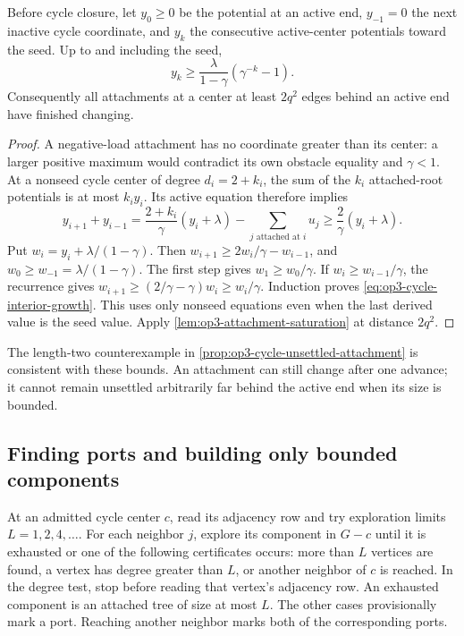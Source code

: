 \begin{lemma}
\label{lem:op3-cycle-interior-growth}
Before cycle closure, let $y_0\geq0$ be the potential at an active end,
$y_{-1}=0$ the next inactive cycle coordinate, and $y_k$ the consecutive
active-center potentials toward the seed. Up to and including the seed,
\begin{equation}
 y_k\geq\frac{\lambda}{1-\gamma}(\gamma^{-k}-1).
 \label{eq:op3-cycle-interior-growth}
\end{equation}
Consequently all attachments at a center at least $2q^2$ edges behind an
active end have finished changing.
\end{lemma}
\begin{proof}
A negative-load attachment has no coordinate greater than its center:
a larger positive maximum would contradict its own obstacle equality and
$\gamma<1$. At a nonseed cycle center of degree $d_i=2+k_i$, the sum of
the $k_i$ attached-root potentials is at most $k_i y_i$. Its active
equation therefore implies
\[
 y_{i+1}+y_{i-1}
 =\frac{2+k_i}{\gamma}(y_i+\lambda)
     -\sum_{j\text{ attached at }i}u_j
 \geq\frac2\gamma(y_i+\lambda).
\]
Put $w_i=y_i+\lambda/(1-\gamma)$. Then
$w_{i+1}\geq2w_i/\gamma-w_{i-1}$, and
$w_0\geq w_{-1}=\lambda/(1-\gamma)$.
The first step gives $w_1\geq w_0/\gamma$. If
$w_i\geq w_{i-1}/\gamma$, the recurrence gives
$w_{i+1}\geq(2/\gamma-\gamma)w_i\geq w_i/\gamma$.
Induction proves \cref{eq:op3-cycle-interior-growth}. This uses only
nonseed equations even when the last derived value is the seed value.
Apply \cref{lem:op3-attachment-saturation} at distance $2q^2$.
\end{proof}

The length-two counterexample in
\cref{prop:op3-cycle-unsettled-attachment} is consistent with these bounds.
An attachment can still change after one advance; it cannot remain
unsettled arbitrarily far behind the active end when its size is bounded.

\subsection{Finding ports and building only bounded components}

At an admitted cycle center $c$, read its adjacency row and try exploration
limits $L=1,2,4,\ldots$. For each neighbor $j$, explore its component in
$G-c$ until it is exhausted or one of the following certificates occurs:
more than $L$ vertices are found, a vertex has degree greater than $L$, or
another neighbor of $c$ is reached. In the degree test, stop before reading
that vertex's adjacency row. An exhausted component is an attached tree of
size at most $L$. The other cases provisionally mark a port. Reaching
another neighbor marks both of the corresponding ports.

